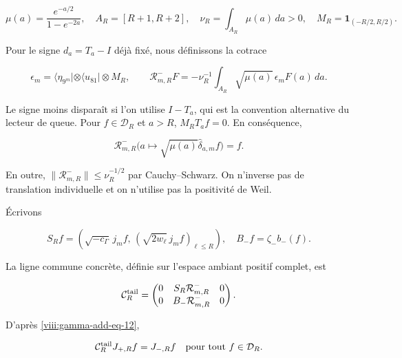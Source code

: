 \begin{equation}
\mu(a)=\frac{e^{-a/2}}{1-e^{-2a}},\quad
A_R=[R+1,R+2],\quad \nu_R=\int_{A_R}\mu(a)\,da>0,
\quad M_R=\mathbf1_{(-R/2,R/2)}.
\label{viii:gamma-add-display-25}
\end{equation}

Pour le signe \(d_a=T_a-I\) déjà fixé, nous définissons la cotrace

\begin{equation}
\epsilon_m=\langle\eta_{9^m}|\otimes\langle u_{81}|\otimes M_R,
\qquad
\mathcal R^-_{m,R}F
=-\nu_R^{-1}\int_{A_R}\sqrt{\mu(a)}\,\epsilon_m F(a)\,da.
\label{viii:gamma-add-eq-11}
\end{equation}

Le signe moins disparaît si l'on utilise \(I-T_a\), qui est la convention alternative du lecteur de queue. Pour \(f\in\mathcal D_R\) et \(a>R\), \(M_RT_af=0\). En conséquence,

\begin{equation}
\mathcal R^-_{m,R}
\bigl(a\mapsto\sqrt{\mu(a)}\widehat\delta_{a,m}f\bigr)=f.
\label{viii:gamma-add-eq-12}
\end{equation}
\label{viii:gamma-add:cola-lector}

En outre, \(\|\mathcal R^-_{m,R}\|\le\nu_R^{-1/2}\) par Cauchy--Schwarz. On n'inverse pas de translation individuelle et on n'utilise pas la positivité de Weil.

Écrivons

\begin{equation}
S_Rf=\left(\sqrt{-c_\Gamma}\,j_mf,\,
              (\sqrt{2w_\ell}\,j_mf)_{\ell\le R}\right),
\quad B_-f=\zeta_-b_-(f).
\label{viii:gamma-add-display-28}
\end{equation}

La ligne commune concrète, définie sur l'espace ambiant positif complet, est

\begin{equation}
\mathcal C_R^{\rm tail}
=
\begin{pmatrix}
0&S_R\mathcal R^-_{m,R}&0\\
0&B_-\mathcal R^-_{m,R}&0
\end{pmatrix}.
\label{viii:gamma-add-eq-13}
\end{equation}

D'après \eqref{viii:gamma-add-eq-12},

\begin{equation}
\mathcal C_R^{\rm tail}J_{+,R}f=J_{-,R}f
\quad\hbox{pour tout }f\in\mathcal D_R.
\label{viii:gamma-add-eq-14}
\end{equation}

